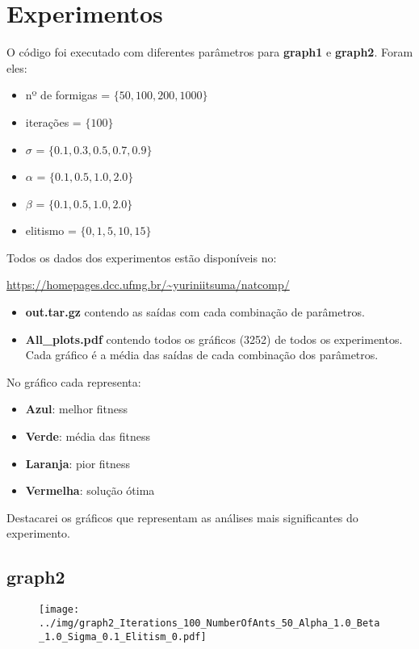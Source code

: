 \section{Experimentos}

O código foi executado com diferentes parâmetros para \textbf{graph1} e \textbf{graph2}.
Foram eles:
\begin{itemize}
  \item nº de formigas = $\{ 50,100,200,1000\}$
  \item iterações = $\{ 100\}$ 
  \item $\sigma$ = $\{ 0.1,0.3,0.5,0.7,0.9\}$
  \item $\alpha$ = $\{ 0.1,0.5,1.0,2.0\}$
  \item $\beta$ = $\{ 0.1,0.5,1.0,2.0\}$
  \item elitismo = $\{ 0,1,5,10,15\}$
\end{itemize}

Todos os dados dos experimentos estão disponíveis no:

\url{https://homepages.dcc.ufmg.br/~yuriniitsuma/natcomp/}

\begin{itemize}
  \item \textbf{out.tar.gz} contendo as saídas com cada combinação de parâmetros.  
  \item \textbf{All\_plots.pdf} contendo todos os gráficos (3252) de todos os experimentos.  
  Cada gráfico é a média das saídas de cada combinação dos parâmetros.
\end{itemize}

No gráfico cada representa:

\begin{itemize}
  \item \textbf{Azul}: melhor fitness
  \item \textbf{Verde}: média das fitness
  \item \textbf{Laranja}: pior fitness
  \item \textbf{Vermelha}: solução ótima
\end{itemize}

Destacarei os gráficos que representam as análises mais significantes do experimento.

\subsection{\textbf{graph2}}

\begin{figure}[H]
  \centering
  \texttt{[image: ../img/graph2\_Iterations\_100\_NumberOfAnts\_50\_Alpha\_1.0\_Beta\_1.0\_Sigma\_0.1\_Elitism\_0.pdf]}
\end{figure}

